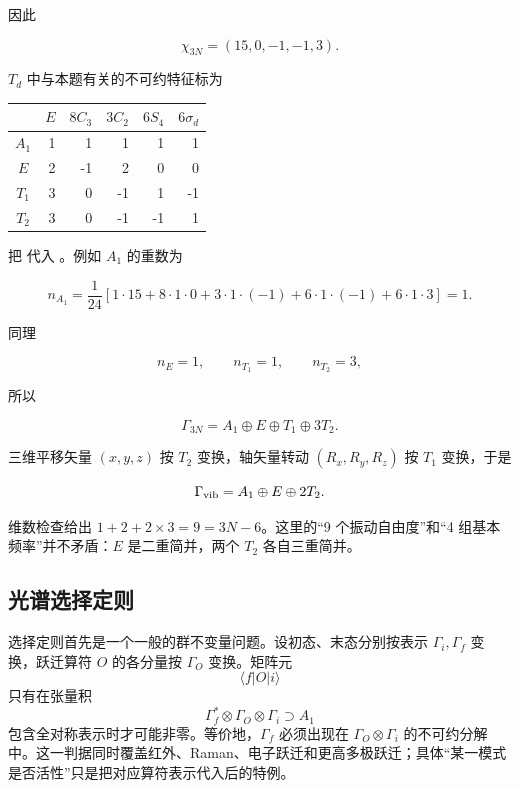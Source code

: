 因此

\begin{equation}
\chi_{3N}
=(15,0,-1,-1,3).
\label{eq:methane-3n-character}
\end{equation}

\(T_d\) 中与本题有关的不可约特征标为

\begin{center}
\begin{tabular}{c|rrrrr}
\toprule
 & \(E\) & \(8C_3\) & \(3C_2\) & \(6S_4\) & \(6\sigma_d\)\\
\midrule
\(A_1\) & 1 & 1 & 1 & 1 & 1\\
\(E\)   & 2 & -1 & 2 & 0 & 0\\
\(T_1\) & 3 & 0 & -1 & 1 & -1\\
\(T_2\) & 3 & 0 & -1 & -1 & 1\\
\bottomrule
\end{tabular}
\end{center}

把  代入 。例如 \(A_1\) 的重数为

\[
n_{A_1}
=\frac1{24}
[1\cdot15+8\cdot1\cdot0+3\cdot1\cdot(-1)
+6\cdot1\cdot(-1)+6\cdot1\cdot3]
=1.
\]

同理

\[
n_E=1,
\qquad
n_{T_1}=1,
\qquad
n_{T_2}=3,
\]

所以

\begin{equation}
\Gamma_{3N}
=A_1\oplus E\oplus T_1\oplus3T_2.
\label{eq:methane-3n-decomposition}
\end{equation}

三维平移矢量 \((x,y,z)\) 按 \(T_2\) 变换，轴矢量转动 \((R_x,R_y,R_z)\) 按 \(T_1\) 变换，于是

\begin{equation}
\Gamma_{\rm vib}
=A_1\oplus E\oplus2T_2.
\label{eq:methane-vibrational-decomposition}
\end{equation}

维数检查给出 \(1+2+2\times3=9=3N-6\)。这里的“9 个振动自由度”和“4 组基本频率”并不矛盾：\(E\) 是二重简并，两个 \(T_2\) 各自三重简并。

\subsection{光谱选择定则}

选择定则首先是一个一般的群不变量问题。设初态、末态分别按表示 \(\Gamma_i,\Gamma_f\) 变换，跃迁算符 \(O\) 的各分量按 \(\Gamma_O\) 变换。矩阵元
\[
\langle f|O|i\rangle
\]
只有在张量积
\begin{equation}
\Gamma_f^*\otimes\Gamma_O\otimes\Gamma_i
\supset A_1
\label{eq:molecular-general-selection-rule}
\end{equation}
包含全对称表示时才可能非零。等价地，\(\Gamma_f\) 必须出现在 \(\Gamma_O\otimes\Gamma_i\) 的不可约分解中。这一判据同时覆盖红外、Raman、电子跃迁和更高多极跃迁；具体“某一模式是否活性”只是把对应算符表示代入后的特例。

